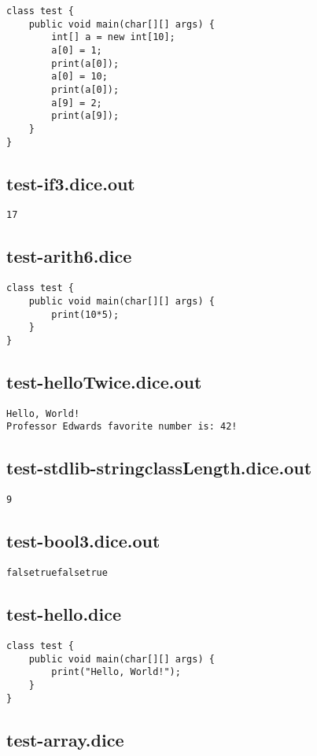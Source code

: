\begin{verbatim}
class test {
	public void main(char[][] args) {
		int[] a = new int[10];
		a[0] = 1;
		print(a[0]);
		a[0] = 10;
		print(a[0]);
		a[9] = 2;
		print(a[9]);
	}
}
\end{verbatim}\pagebreak\subsection{test-if3.dice.out}
\begin{verbatim}
17
\end{verbatim}\pagebreak\subsection{test-arith6.dice}
\begin{verbatim}
class test {
	public void main(char[][] args) {
		print(10*5);
	}
}

\end{verbatim}\pagebreak\subsection{test-helloTwice.dice.out}
\begin{verbatim}
Hello, World!
Professor Edwards favorite number is: 42!

\end{verbatim}\pagebreak\subsection{test-stdlib-stringclassLength.dice.out}
\begin{verbatim}
9
\end{verbatim}\pagebreak\subsection{test-bool3.dice.out}
\begin{verbatim}
falsetruefalsetrue
\end{verbatim}\pagebreak\subsection{test-hello.dice}
\begin{verbatim}
class test {
	public void main(char[][] args) {
		print("Hello, World!");
	}
}
\end{verbatim}\pagebreak\subsection{test-array.dice}
